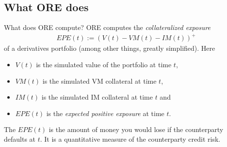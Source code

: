 \documentclass[t]{beamer}
\begin{document}
\subsection{What ORE does}

\begin{frame}{What does ORE compute?}
	ORE computes the \emph{collateralized exposure}
	\begin{align*}
	EPE(t) := (V(t) - VM(t) - IM(t) )^+
	\end{align*}
	of a derivatives portfolio (among other things, greatly simplified). Here
	\begin{itemize}
			\item
				$V(t)$ is the simulated value of the portfolio at time $t$,
			\item
				$VM(t)$ is the simulated VM collateral at time $t$,
			\item
				$IM(t)$ is the simulated IM collateral at time $t$ and
			\item
				$EPE(t)$ is the \emph{expected positive exposure} at time $t$. 
	\end{itemize}
	The $EPE(t)$ is the amount of money you would lose if the counterparty defaults at $t$. It is a quantitative measure of the counterparty credit risk.
\end{frame}

\end{document}
